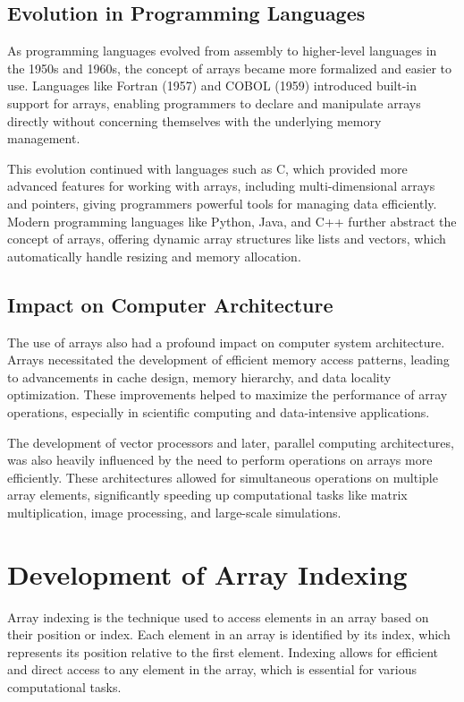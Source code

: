 \documentclass{book}
\begin{document}
	\subsection{Evolution in Programming Languages}
	
	As programming languages evolved from assembly to higher-level languages in the 1950s and 1960s, the concept of arrays became more formalized and easier to use. Languages like Fortran (1957) and COBOL (1959) introduced built-in support for arrays, enabling programmers to declare and manipulate arrays directly without concerning themselves with the underlying memory management.
	
	This evolution continued with languages such as C, which provided more advanced features for working with arrays, including multi-dimensional arrays and pointers, giving programmers powerful tools for managing data efficiently. Modern programming languages like Python, Java, and C++ further abstract the concept of arrays, offering dynamic array structures like lists and vectors, which automatically handle resizing and memory allocation.
	
	\subsection{Impact on Computer Architecture}
	
	The use of arrays also had a profound impact on computer system architecture. Arrays necessitated the development of efficient memory access patterns, leading to advancements in cache design, memory hierarchy, and data locality optimization. These improvements helped to maximize the performance of array operations, especially in scientific computing and data-intensive applications.
	
	The development of vector processors and later, parallel computing architectures, was also heavily influenced by the need to perform operations on arrays more efficiently. These architectures allowed for simultaneous operations on multiple array elements, significantly speeding up computational tasks like matrix multiplication, image processing, and large-scale simulations.
	
	\section{Development of Array Indexing}
	
	Array indexing is the technique used to access elements in an array based on their position or index. Each element in an array is identified by its index, which represents its position relative to the first element. Indexing allows for efficient and direct access to any element in the array, which is essential for various computational tasks.
	
\end{document}
